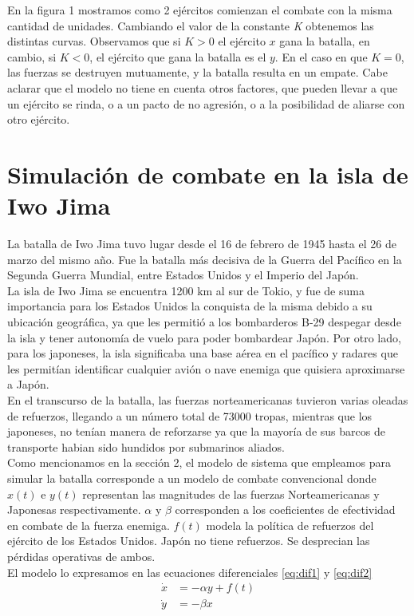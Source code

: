 \documentclass[10pt,journal,compsoc]{IEEEtran}
\begin{document}
En la figura 1 mostramos como 2 ej\'ercitos comienzan el combate con la misma cantidad 
de unidades.  Cambiando el valor de la constante \emph{K} obtenemos las distintas curvas. Observamos que
si $K>0$ el ej\'ercito $x$ gana la batalla, en cambio, si $K<0$, el ej\'ercito que gana la batalla es el $y$.
En el caso en que $K=0$, las fuerzas se destruyen mutuamente, y la batalla resulta en un empate.  Cabe aclarar que 
el modelo no tiene en cuenta otros factores, que pueden llevar a que un ej\'ercito se rinda, o a un 
pacto de no agresi\'on, o a la posibilidad de aliarse con otro ej\'ercito.

\section{Simulaci\'on de combate en la isla de Iwo Jima}
 
La batalla de Iwo Jima tuvo lugar desde el 16 de febrero de 1945 hasta el 26 de marzo del mismo a\~no.
 Fue la batalla m\'as decisiva de la Guerra del Pac\'ifico en la Segunda Guerra Mundial, entre Estados Unidos y 
el Imperio del Jap\'on.\\
\indent La isla de Iwo Jima se encuentra 1200 km al sur de Tokio, y fue de suma importancia para los Estados Unidos 
la conquista de la misma debido a su ubicaci\'on geogr\'afica, ya que les permiti\'o a los bombarderos B-29 
despegar desde la isla y tener autonom\'ia de vuelo para poder bombardear Jap\'on. Por otro lado, para los japoneses,
 la isla significaba una base a\'erea en el pac\'ifico y radares que les permit\'ian identificar cualquier
 avi\'on o nave enemiga que quisiera aproximarse a Jap\'on.\\
\indent En el transcurso de la batalla, las fuerzas norteamericanas tuvieron varias oleadas de refuerzos, llegando a
 un n\'umero total de 73000 tropas, mientras que los japoneses, 
no ten\'ian manera de reforzarse ya que la mayor\'ia de sus barcos de transporte habian sido hundidos por submarinos
 aliados.\\
\indent Como mencionamos en la secci\'on 2, el modelo de sistema que empleamos para simular la batalla corresponde a un modelo de combate convencional
 donde $x(t)$ e $y(t)$ representan
las magnitudes de las fuerzas Norteamericanas y Japonesas respectivamente. $\alpha $ y $\beta$ corresponden a 
los coeficientes de efectividad en combate de la fuerza enemiga. $f(t)$ modela la pol\'itica de refuerzos del
 ej\'ercito de los Estados Unidos. Jap\'on no tiene refuerzos. Se desprecian las p\'erdidas operativas de ambos.\\
El modelo lo expresamos en las ecuaciones diferenciales \ref{eq:dif1} y \ref{eq:dif2}
\begin{align}
\label{eq:dif1}
\dot{x} &= -\alpha y + f(t) \\
\label{eq:dif2}
\dot{y} &= -\beta x
\end{align}
\end{document}
